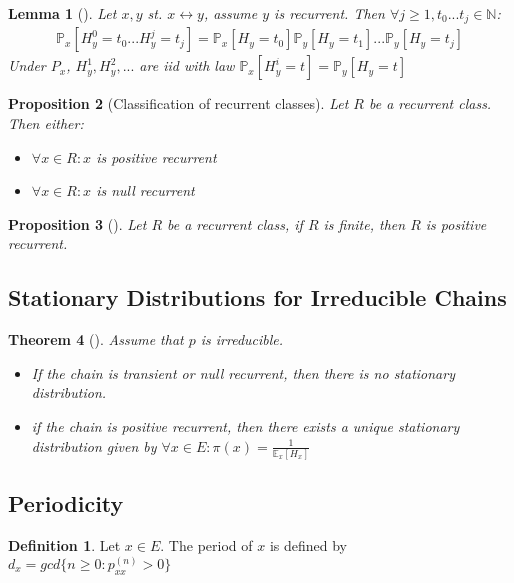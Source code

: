 \documentclass[12pt]{book}
\newtheorem{theorem}{Theorem}[section]
\newtheorem{prop}[theorem]{Proposition}
\newtheorem{lemma}[theorem]{Lemma}
\theoremstyle{definition}
\newtheorem{defn}{Definition}[section]
\theoremstyle{remark}
\begin{document}
\begin{lemma}[]
	Let $x,y$ st. $x \leftrightarrow y$, assume $y$ is recurrent. Then $\forall j \geq 1, t_0...t_j \in \mathbb{N}$:
\begin{align}
	\mathbb{P}_{x} \left[ H_y^0=t_0...H_y^j=t_j \right] = \mathbb{P}_{x} \left[ H_y=t_0 \right] \mathbb{P}_{y} \left[ H_y=t_1 \right] ... \mathbb{P}_{y} \left[ H_y=t_j \right] 
\end{align}
Under $P_x$, $H_y^1,H_y^2,...$ are iid with law $\mathbb{P}_{x} \left[ H_y^i=t \right] = \mathbb{P}_{y} \left[ H_y=t \right] $
\end{lemma}

\begin{prop}[Classification of recurrent classes]
	Let $R$ be a recurrent class. Then either:
\begin{itemize}
	\item $\forall x \in R: x$ is positive recurrent
	\item $\forall x \in R: x$ is null recurrent
\end{itemize}

\end{prop}

\begin{prop}[]
	Let $R$ be a recurrent class, if $R$ is finite, then $R$ is positive recurrent.
\end{prop}

\subsection{Stationary Distributions for Irreducible Chains}
\begin{theorem}[]
	Assume that $p$ is irreducible. 
\begin{itemize}
	\item If the chain is transient or null recurrent, then there is no stationary distribution.
	\item if the chain is positive recurrent, then there exists a unique stationary distribution given by $\forall x \in E: \pi (x) = \frac{1}{\mathbb{E}_{x} \left[ H_x \right] }$
\end{itemize}

\end{theorem}

\subsection{Periodicity}
\begin{defn}
	Let $x \in E$. The period of $x$ is defined by $d_x = gcd\{n\geq 0: p_{xx}^{(n)}>0\}$
\end{defn}
\end{document}

